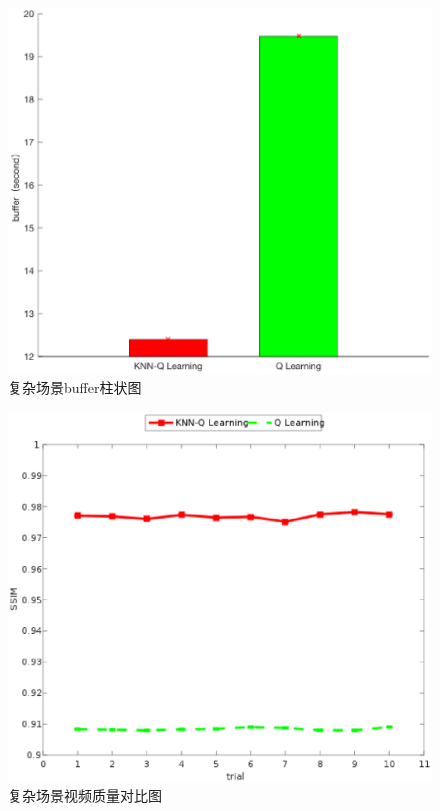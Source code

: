 \documentclass[twocolumn]{article}
\begin{document}
\begin{figure}[htbp]
\centering
\includegraphics[width=\columnwidth]{complex_buffer_bar_graph}
\caption{复杂场景buffer柱状图}
\label{complex_buffer_bar_graph}
\end{figure}
\begin{figure}[htbp]
\centering
\includegraphics[width=\columnwidth]{complex_ssim_compare}
\caption{复杂场景视频质量对比图}
\label{complex_ssim_compare}
\end{figure}
\end{document}
